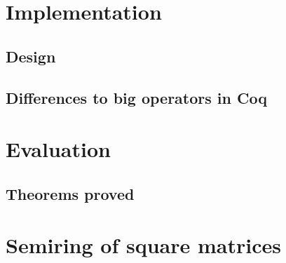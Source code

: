 \chapter{Implementation}

\section{Design}

\section{Differences to big operators in Coq}

\chapter{Evaluation}

\section{Theorems proved}

\appendix

\chapter{Semiring of square matrices}


